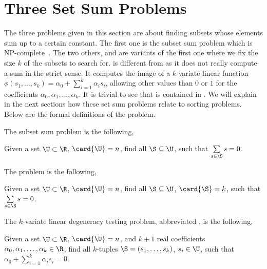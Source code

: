 
\section{Three Set Sum Problems}

The three problems given in this section are about finding subsets whose
elements sum up to a certain constant. The first one is the subset sum problem
which is NP-complete~\cite{karp:1972}. The two others, \kSUM and \kLDT are variants of the
first one where we fix the size $k$ of the subsets to search for. \kLDT is
different from \kSUM as it does not really compute a sum in the strict sense.
It computes the image of a $k$-variate linear function $\phi(s_1, \ldots, s_k)
= \alpha_0 + \sum_{i=1}^{k} \alpha_i s_i$, allowing other values than $0$ or
$1$ for the coefficients $\alpha_0, \alpha_1, \ldots, \alpha_k$. It is trivial
to see that \kSUM is contained in \kLDT. We will explain in the next sections
how these set sum problems relate to sorting problems. Below are the formal
definitions of the problem.

The subset sum problem is the following,

\begin{problem}
Given a set $\U \subset \R$, $\card{\U} = n$, find all
$\S \subseteq \U$, such that $\sum\limits_{s \in \S} s = 0$.
\end{problem}


The \kSUM problem is the following,

\begin{problem}
Given a set $\U \subset \R$, $\card{\U} = n$, find all
$\S \subseteq \U$, $\card{\S} = k$, such that $\sum\limits_{s
\in \S} s = 0$.
\end{problem}


The $k$-variate linear degeneracy testing problem, abbreviated \kLDT, is the
following,

\begin{problem}
Given a set $\U \subset \R$, $\card{\U} = n$, and $k+1$ real
coefficients $\alpha_0, \alpha_1, \ldots, \alpha_k \in \R$, find all $k$-tuples
$\S = (s_1, \ldots, s_k)$, $s_i \in \U$, such that
$\alpha_0 + \sum_{i=1}^{k} \alpha_i s_i = 0$.
\end{problem}

